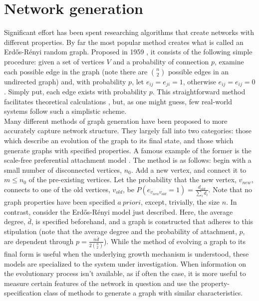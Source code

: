 \documentclass[11pt]{article}
\begin{document}
\section{Network generation}
\indent Significant effort has been spent researching algorithms that create networks with different properties. By far the most popular method creates what is called an Erd\H{o}s-R\'{e}nyi random graph. Proposed in 1959 \cite{Erdos1959}, it consists of the following simple procedure: given a set of vertices $V$ and a probability of connection $p$, examine each possible edge in the graph (note there are ${n \choose 2}$ possible edges in an undirected graph) and, with probability $p$, let $e_{ij}=e_{ji}=1$, otherwise $e_{ij}=e_{ij}=0$. Simply put, each edge exists with probability $p$. This straightforward method facilitates theoretical calculations \cite{a couple math papers}, but, as one might guess, few real-world systems follow such a simplistic scheme. \vspace{1mm}\\
\indent Many different methods of graph generation have been proposed to more accurately capture network structure. They largely fall into two categories: those which describe an evolution of the graph to its final state, and those which generate graphs with specified properties. A famous example of the former is the scale-free preferential attachment model \cite{Barabasi1999}. The method is as follows: begin with a small number of disconnected vertices, $n_{0}$. Add a new vertex, and connect it to $m\le n_{0}$ of the pre-existing vertices. Let the probability that the new vertex, $v_{new}$, connects to one of the old vertices, $v_{old}$, be $P(e_{v_{new}v_{old}}=1)=\frac{d_{old}}{\sum\limits_{i} d_{i}}$. Note that no graph properties have been specified $a\ priori$, except, trivially, the size $n$. In contrast, consider the Erd\H{o}s-R\'{e}nyi model just described. Here, the average degree, $\bar{d}$, is specified beforehand, and a graph is constructed that adheres to this stipulation (note that the average degree and the probability of attachment, $p$, are dependent through $p=\frac{n\bar{d}}{2 {n \choose 2}}$). While the method of evolving a graph to its final form is useful when the underlying growth mechanism is understood, these models are specialized to the system under investigation. When information on the evolutionary process isn't available, as if often the case, it is more useful to measure certain features of the network in question and use the property-specification class of methods to generate a graph with similar characteristics.\vspace{1mm}\\
\end{document}
